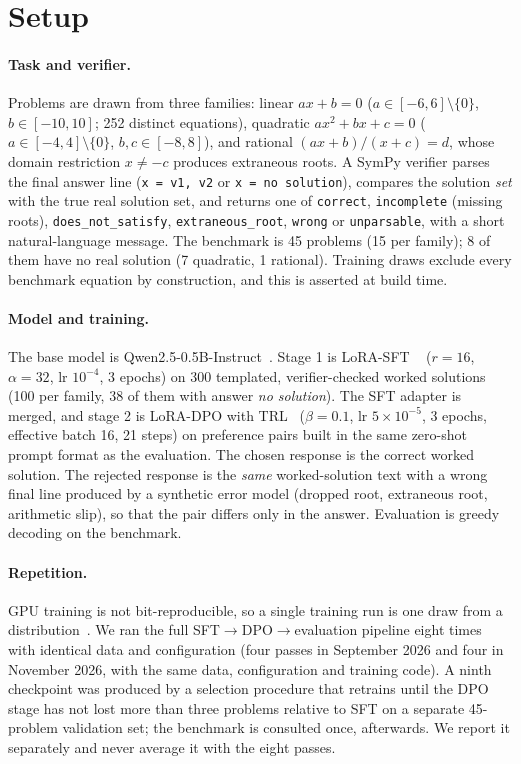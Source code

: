 \documentclass[10pt]{article}
\newcommand{\nosol}{\emph{no solution}}
\begin{document}
\section{Setup}
\label{sec:setup}

\paragraph{Task and verifier.}
Problems are drawn from three families: linear $ax+b=0$ ($a\in[-6,6]\setminus\{0\}$,
$b\in[-10,10]$; 252 distinct equations), quadratic $ax^2+bx+c=0$
($a\in[-4,4]\setminus\{0\}$, $b,c\in[-8,8]$), and rational $(ax+b)/(x+c)=d$, whose
domain restriction $x\neq -c$ produces extraneous roots. A SymPy verifier parses the
final answer line (\texttt{x = v1, v2} or \texttt{x = no solution}), compares the
solution \emph{set} with the true real solution set, and returns one of
\texttt{correct}, \texttt{incomplete} (missing roots), \texttt{does\_not\_satisfy},
\texttt{extraneous\_root}, \texttt{wrong} or \texttt{unparsable}, with a short
natural-language message. The benchmark is 45 problems (15 per family); 8 of them have
no real solution (7 quadratic, 1 rational). Training draws exclude every benchmark
equation by construction, and this is asserted at build time.

\paragraph{Model and training.}
The base model is Qwen2.5-0.5B-Instruct~\citep{qwen2025qwen25}. Stage 1 is LoRA-SFT
~\citep{hu2022lora} ($r{=}16$, $\alpha{=}32$, lr $10^{-4}$, 3 epochs) on 300 templated,
verifier-checked worked solutions (100 per family, 38 of them with answer \nosol{}).
The SFT adapter is merged, and stage 2 is LoRA-DPO with TRL~\citep{vonwerra2020trl}
($\beta{=}0.1$, lr $5{\times}10^{-5}$, 3 epochs, effective batch 16, 21 steps) on
preference pairs built in the same zero-shot prompt format as the evaluation. The
chosen response is the correct worked solution. The rejected response is the
\emph{same} worked-solution text with a wrong final line produced by a synthetic error
model (dropped root, extraneous root, arithmetic slip), so that the pair differs only in
the answer. Evaluation is greedy decoding on the benchmark.

\paragraph{Repetition.}
GPU training is not bit-reproducible, so a single training run is one draw from a
distribution~\citep{dodge2020finetuning,bouthillier2021variance}. We ran the full
SFT$\to$DPO$\to$evaluation pipeline eight times with identical data and configuration
(four passes in September 2026 and four in November 2026, with the same data,
configuration and training code). A ninth checkpoint was produced by a selection procedure that
retrains until the DPO stage has not lost more than three problems relative to SFT on a
separate 45-problem validation set; the benchmark is consulted once, afterwards. We
report it separately and never average it with the eight passes.
\end{document}
